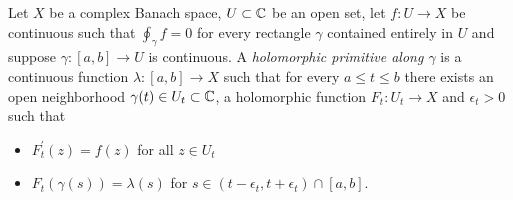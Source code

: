 \begin{defn}Let $X$ be a complex Banach space, $U \subset \mathbb{C}$ be an open set, let $f: U \to X$ be continuous such that $\oint_\gamma f = 0$ for every rectangle $\gamma$ contained entirely in $U$ and suppose $\gamma : [a,b] \to U$ is continuous.   A \emph{holomorphic primitive along $\gamma$} is a continuous function $\lambda : [a,b] \to X$ such that for every $a \leq t \leq b$ there exists an open neighborhood $\gamma(t) \in U_t\subset \mathbb{C}$, a holomorphic function $F_t : U_t \to X$ and $\epsilon_t > 0$ such that 
  \begin{itemize}
  \item[(i)] $F_t^{\prime}(z) = f(z)$ for all  $z \in U_t$
  \item[(ii)] $F_t(\gamma(s)) = \lambda(s)$ for $s \in (t - \epsilon_t, t + \epsilon_t) \cap [a,b]$.
  \end{itemize}
\end{defn}

